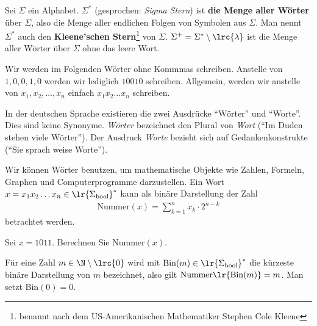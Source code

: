 \begin{mydefinition}
Sei $\Sigma$ ein Alphabet. $\Sigma^*$ (gesprochen: \textit{Sigma Stern}) ist \textbf{die Menge aller Wörter} über $\Sigma$, also die Menge aller endlichen Folgen von Symbolen aus $\Sigma$. Man nennt $\Sigma^{*}$ auch den \textbf{Kleene'schen Stern}\footnote{benannt nach dem US-Amerikanischen Mathematiker Stephen Cole Kleene} von $\Sigma$. $\Sigma^+ = \Sigma^*\setminus\lrc{\lambda}$ ist die Menge aller Wörter über $\Sigma$ ohne das leere Wort.
\end{mydefinition}

Wir werden im Folgenden Wörter ohne Kommmas schreiben. Anstelle von $1,0,0,1,0$ werden wir lediglich $10010$ schreiben. Allgemein, werden wir anstelle von $x_1,x_2,\ldots ,x_n$ einfach $x_1x_2\ldots x_n$ schreiben.
\begin{myremark}
	In der deutschen Sprache existieren die zwei Ausdrücke \enquote{Wörter} und \enquote{Worte}. Dies sind keine Synonyme. \textit{Wörter} bezeichnet den Plural von \textit{Wort} (\enquote{Im Duden stehen viele Wörter}). Der Ausdruck \textit{Worte} bezieht sich auf Gedankenkonstrukte (\enquote{Sie sprach weise Worte}).
\end{myremark}

Wir können Wörter benutzen, um mathematische Objekte wie Zahlen, Formeln, Graphen und Computerprogramme darzustellen. Ein Wort $x = x_1x_2\ldots x_n\in \lr{\Sigma_{\text{bool}}}^*$ kann als binäre Darstellung der Zahl
\begin{align}\label{eq:Nummer}
	\text{Nummer}(x)=\displaystyle\sum_{k=1}^n x_k\cdot 2^{n-k}
\end{align}
betrachtet werden.

\begin{myexercise}\label{myexercise:0298}
	Sei $x = 1011$. Berechnen Sie $\text{Nummer}(x)$.
\end{myexercise}
Für eine Zahl $m\in\N\setminus\lrc{0}$ wird mit $\text{Bin}(m)\in \lr{\Sigma_{\text{bool}}}^*$ die kürzeste binäre Darstellung von $m$ bezeichnet, also gilt $\text{Nummer}\lr{\text{Bin}(m)} = m$. Man setzt $\text{Bin}(0) = 0$.

